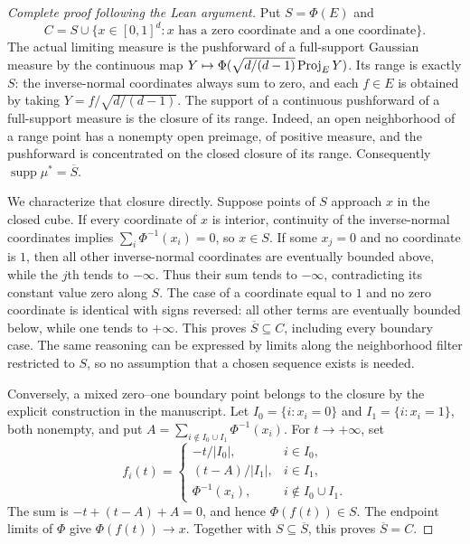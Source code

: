 \begin{proof}[Complete proof following the Lean argument]
Put $S=\Phi(E)$ and
\[
 C=S\cup\{x\in[0,1]^d:\text{$x$ has a zero coordinate and a one coordinate}\}.
\]
The actual limiting measure is the pushforward of a full-support Gaussian
measure by the continuous map
$Y\mapsto\Phi(\sqrt{d/(d-1)}\operatorname{Proj}_EY)$.
Its range is exactly $S$: the inverse-normal coordinates always sum to zero,
and each $f\in E$ is obtained by taking $Y=f/\sqrt{d/(d-1)}$.
The support of a continuous pushforward of a full-support measure is the
closure of its range. Indeed, an open neighborhood of a range point has
a nonempty open preimage, of positive measure, and the pushforward is
concentrated on the closed closure of its range. Consequently
$\operatorname{supp}\mu^\ast=\overline S$.

We characterize that closure directly. Suppose points of $S$ approach
$x$ in the closed cube. If every coordinate of $x$ is interior, continuity
of the inverse-normal coordinates implies
$\sum_i\Phi^{-1}(x_i)=0$, so $x\in S$.
If some $x_j=0$ and no coordinate is $1$, then all other inverse-normal
coordinates are eventually bounded above, while the $j$th tends to
$-\infty$. Thus their sum tends to $-\infty$, contradicting its constant
value zero along $S$.
The case of a coordinate equal to $1$ and no zero coordinate is identical
with signs reversed: all other terms are eventually bounded below, while
one tends to $+\infty$.
This proves $\overline S\subseteq C$, including every boundary case.
The same reasoning can be expressed by limits along the neighborhood
filter restricted to $S$, so no assumption that a chosen sequence exists
is needed.

Conversely, a mixed zero--one boundary point belongs to the closure by the
explicit construction in the manuscript. Let
$I_0=\{i:x_i=0\}$ and $I_1=\{i:x_i=1\}$, both nonempty, and put
$A=\sum_{i\notin I_0\cup I_1}\Phi^{-1}(x_i)$.
For $t\to+\infty$, set
\[
 f_i(t)=
 \begin{cases}
  -t/|I_0|,&i\in I_0,\\
  (t-A)/|I_1|,&i\in I_1,\\
  \Phi^{-1}(x_i),&i\notin I_0\cup I_1.
 \end{cases}
\]
The sum is $-t+(t-A)+A=0$, and hence $\Phi(f(t))\in S$.
The endpoint limits of $\Phi$ give $\Phi(f(t))\to x$.
Together with $S\subseteq\overline S$, this proves $\overline S=C$.


\end{proof}
